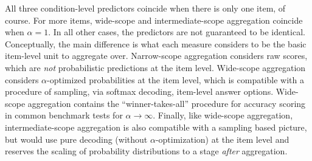 \documentclass[fleqn]{article}
\begin{document}
All three condition-level predictors coincide when there is only one item, of course.
For more items, wide-scope and intermediate-scope aggregation coincide when $\alpha = 1$.
In all other cases, the predictors are not guaranteed to be identical.
Conceptually, the main difference is what each measure considers to be the basic item-level unit to aggregate over.
Narrow-scope aggregation considers raw scores, which are \emph{not} probabilistic predictions at the item level.
Wide-scope aggregation considers $\alpha$-optimized probabilities at the item level, which is compatible with a procedure of sampling, via softmax decoding, item-level answer options.
Wide-scope aggregation contains the ``winner-takes-all'' procedure for accuracy scoring in common benchmark tests for $\alpha \rightarrow \infty$.
Finally, like wide-scope aggregation, intermediate-scope aggregation is also compatible with a sampling based picture, but would use pure decoding (without $\alpha$-optimization) at the item level and reserves the scaling of probability distributions to a stage \emph{after} aggregation.


\end{document}
